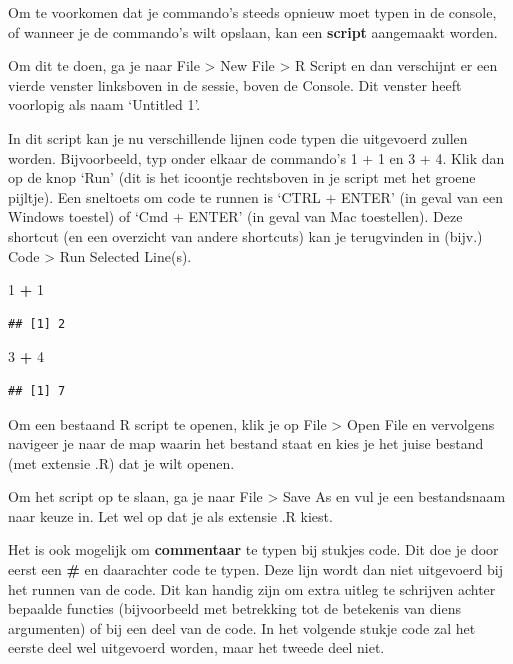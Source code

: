 \documentclass[
]{book}
\newenvironment{Shaded}{\begin{snugshade}}{\end{snugshade}}
\newcommand{\DecValTok}[1]{\textcolor[rgb]{0.00,0.00,0.81}{#1}}
\newcommand{\SpecialCharTok}[1]{\textcolor[rgb]{0.81,0.36,0.00}{\textbf{#1}}}
\begin{document}
Om te voorkomen dat je commando's steeds opnieuw moet typen in de console, of
wanneer je de commando's wilt opslaan, kan een \textbf{script} aangemaakt worden.

Om dit te doen, ga je naar File \textgreater{} New File \textgreater{} R Script en dan verschijnt er een vierde
venster linksboven in de sessie, boven de Console. Dit venster heeft voorlopig als naam `Untitled 1'.

In dit script kan je nu verschillende lijnen code typen die uitgevoerd zullen worden. Bijvoorbeeld, typ onder elkaar de commando's 1 + 1 en 3 + 4. Klik dan op de knop `Run' (dit is het icoontje rechtsboven in je script met het groene pijltje). Een sneltoets om code te runnen is `CTRL + ENTER' (in geval van een Windows toestel) of `Cmd + ENTER' (in geval van Mac toestellen). Deze shortcut (en een overzicht van andere shortcuts) kan je terugvinden in (bijv.) Code \textgreater{} Run Selected Line(s).

\begin{Shaded}
\begin{Highlighting}[]
\DecValTok{1} \SpecialCharTok{+} \DecValTok{1}
\end{Highlighting}
\end{Shaded}

\begin{verbatim}
## [1] 2
\end{verbatim}

\begin{Shaded}
\begin{Highlighting}[]
\DecValTok{3} \SpecialCharTok{+} \DecValTok{4}
\end{Highlighting}
\end{Shaded}

\begin{verbatim}
## [1] 7
\end{verbatim}

Om een bestaand R script te openen, klik je op File \textgreater{} Open File en vervolgens navigeer je naar de map waarin het bestand staat en kies je het juise bestand (met extensie .R) dat je wilt openen.

Om het script op te slaan, ga je naar File \textgreater{} Save As en vul je een bestandsnaam naar keuze in. Let wel op dat je als extensie .R kiest.

Het is ook mogelijk om \textbf{commentaar} te typen bij stukjes code. Dit doe je door eerst een \textbf{\#} en daarachter code te typen. Deze lijn wordt dan niet uitgevoerd bij het runnen van de code. Dit kan handig zijn om extra uitleg te schrijven achter bepaalde functies (bijvoorbeeld met betrekking tot de betekenis van diens argumenten) of bij een deel van de code. In het volgende stukje code zal het eerste deel wel uitgevoerd worden, maar het tweede deel niet.
\end{document}
